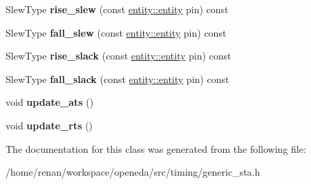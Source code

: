 \begin{DoxyCompactItemize}
\item 
\hypertarget{classophidian_1_1timing_1_1generic__sta_abd6c368e8f7fec86bc77dc9f9b760a6d}{Slew\-Type {\bfseries rise\-\_\-slew} (const \hyperlink{classophidian_1_1entity_1_1entity}{entity\-::entity} pin) const }\label{classophidian_1_1timing_1_1generic__sta_abd6c368e8f7fec86bc77dc9f9b760a6d}

\item 
\hypertarget{classophidian_1_1timing_1_1generic__sta_ab450a9b45eed360c9ffd64677ce699f7}{Slew\-Type {\bfseries fall\-\_\-slew} (const \hyperlink{classophidian_1_1entity_1_1entity}{entity\-::entity} pin) const }\label{classophidian_1_1timing_1_1generic__sta_ab450a9b45eed360c9ffd64677ce699f7}

\item 
\hypertarget{classophidian_1_1timing_1_1generic__sta_a5dbde3bc77aeb9b0017ba7fac911d209}{Slew\-Type {\bfseries rise\-\_\-slack} (const \hyperlink{classophidian_1_1entity_1_1entity}{entity\-::entity} pin) const }\label{classophidian_1_1timing_1_1generic__sta_a5dbde3bc77aeb9b0017ba7fac911d209}

\item 
\hypertarget{classophidian_1_1timing_1_1generic__sta_a91d6e96212fa521eb9c23bff5bffa992}{Slew\-Type {\bfseries fall\-\_\-slack} (const \hyperlink{classophidian_1_1entity_1_1entity}{entity\-::entity} pin) const }\label{classophidian_1_1timing_1_1generic__sta_a91d6e96212fa521eb9c23bff5bffa992}

\item 
\hypertarget{classophidian_1_1timing_1_1generic__sta_ae9cf6c1e7fdcc7231f50a80bc51fc763}{void {\bfseries update\-\_\-ats} ()}\label{classophidian_1_1timing_1_1generic__sta_ae9cf6c1e7fdcc7231f50a80bc51fc763}

\item 
\hypertarget{classophidian_1_1timing_1_1generic__sta_a72cd9fcb49e2690b491dcbaae360a200}{void {\bfseries update\-\_\-rts} ()}\label{classophidian_1_1timing_1_1generic__sta_a72cd9fcb49e2690b491dcbaae360a200}

\end{DoxyCompactItemize}


The documentation for this class was generated from the following file\-:\begin{DoxyCompactItemize}
\item 
/home/renan/workspace/openeda/src/timing/generic\-\_\-sta.\-h\end{DoxyCompactItemize}
